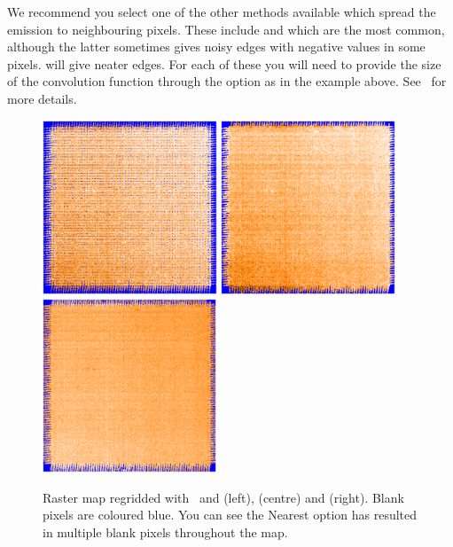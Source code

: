 \documentclass[11pt,oneside,chapters]{starlink}
\begin{document}
We recommend you select one of the other methods available which
spread the emission to neighbouring pixels.  These include
 and  which are the most common, although
the latter sometimes gives noisy edges with negative values in some
pixels.  will give neater edges. For each of these you
will need to provide the size of the convolution function through the
 option as in the example above. See \smurfsun\ for more
details.


\begin{figure}[h!]
\begin{center}
\includegraphics[width=5.2cm, height=5.2cm]{sc20_nearest.eps}
\includegraphics[width=5.2cm, height=5.2cm]{sc20_gauss.eps}
\includegraphics[width=5.2cm, height=5.2cm]{sc20_sincsinc.eps}
\label{fig:spread}
\caption[Options for the \makecube\ parameter `spread']{Raster map
regridded with \makecube\ and  (left),
 (centre) and  (right). Blank pixels are
coloured blue. You can see the Nearest option has resulted in multiple
blank pixels throughout the map.}
\end{center}
\end{figure}
\end{document}
